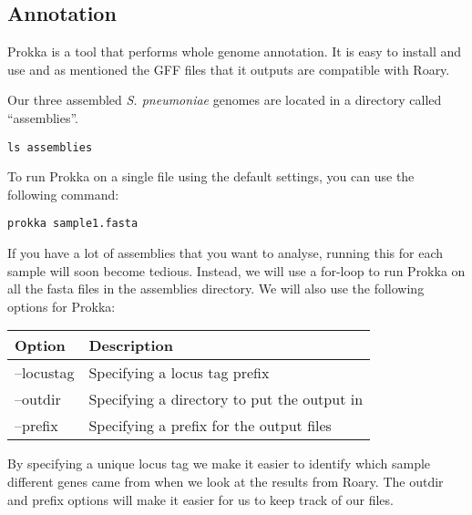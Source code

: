 \documentclass[11pt]{article}
\makeatletter
\newcommand{\boxspacing}{\kern\kvtcb@left@rule\kern\kvtcb@boxsep}
\newcommand{\prompt}[4]{
         {\ttfamily\llap{{\color{blue}\LARGE\faKeyboardO\hspace{3pt}#4}}\vspace{-\baselineskip}}
    }
\makeatother
\begin{document}
\hypertarget{annotation}{%
\subsection{Annotation}\label{annotation}}

Prokka is a tool that performs whole genome annotation. It is easy to
install and use and as mentioned the GFF files that it outputs are
compatible with Roary.

Our three assembled \textit{S. pneumoniae} genomes are located in a
directory called ``assemblies''.

    \begin{tcolorbox}[breakable, size=fbox, boxrule=1pt, pad at break*=1mm,colback=cellbackground, colframe=cellborder]
\prompt{In}{incolor}{ }{\boxspacing}
\begin{Verbatim}[commandchars=\\\{\}]
ls assemblies
\end{Verbatim}
\end{tcolorbox}

    To run Prokka on a single file using the default settings, you can use
the following command:

\begin{verbatim}
prokka sample1.fasta
\end{verbatim}

If you have a lot of assemblies that you want to analyse, running this
for each sample will soon become tedious. Instead, we will use a
for-loop to run Prokka on all the fasta files in the assemblies
directory. We will also use the following options for Prokka:

\begin{longtable}[]{@{}ll@{}}
\toprule
Option & Description \\
\midrule
\endhead
--locustag & Specifying a locus tag prefix \\
--outdir & Specifying a directory to put the output in \\
--prefix & Specifying a prefix for the output files \\
\bottomrule
\end{longtable}

By specifying a unique locus tag we make it easier to identify which
sample different genes came from when we look at the results from Roary.
The outdir and prefix options will make it easier for us to keep track
of our files.
\end{document}
